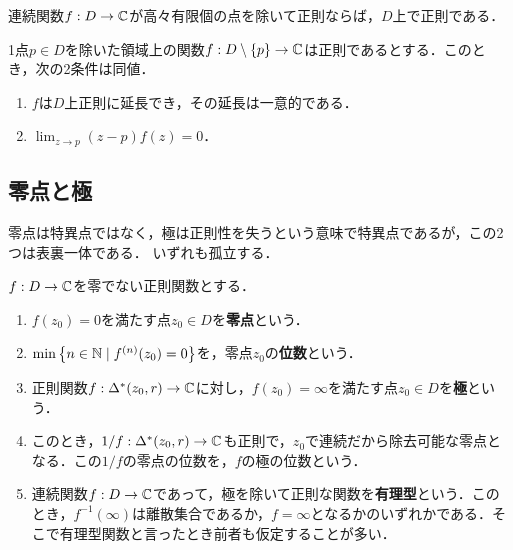 \documentclass[uplatex, dvipdfmx]{jsreport}
\begin{document}
\begin{corollary}[連続性による除去]
    連続関数$f:D\to\mathbb{C}$が高々有限個の点を除いて正則ならば，$D$上で正則である．
\end{corollary}

\begin{corollary}[除去可能特異点の特徴付け]
    1点$p\in D$を除いた領域上の関数$f:D\setminus\{p\}\to\mathbb{C}$は正則であるとする．このとき，次の2条件は同値．
    \begin{enumerate}
        \item $f$は$D$上正則に延長でき，その延長は一意的である．
        \item $\lim_{z\to p}(z-p)f(z)=0$．
    \end{enumerate}
\end{corollary}

\subsection{零点と極}

\begin{tcolorbox}[colframe=ForestGreen, colback=ForestGreen!10!white,breakable,colbacktitle=ForestGreen!40!white,coltitle=black,fonttitle=\bfseries\sffamily,
title=]
    零点は特異点ではなく，極は正則性を失うという意味で特異点であるが，この2つは表裏一体である．
    いずれも孤立する．
\end{tcolorbox}

\begin{definition}
    $f:D\to\mathbb{C}$を零でない正則関数とする．
    \begin{enumerate}
        \item $f(z_0)=0$を満たす点$z_0\in D$を\textbf{零点}という．
        \item $\min\left\{n\in\mathbb{N}\mid f^{(n)}(z_0)=0\right\}$を，零点$z_0$の\textbf{位数}という．
        \item 正則関数$f:\Delta^*(z_0,r)\to\mathbb{C}$に対し，$f(z_0)=\infty$を満たす点$z_0\in D$を\textbf{極}という．
        \item このとき，$1/f:\Delta^*(z_0,r)\to\mathbb{C}$も正則で，$z_0$で連続だから除去可能な零点となる．この$1/f$の零点の位数を，$f$の極の位数という．
        \item 連続関数$f:D\to\mathbb{C}$であって，極を除いて正則な関数を\textbf{有理型}という．このとき，$f^{-1}(\infty)$は離散集合であるか，$f=\infty$となるかのいずれかである．そこで有理型関数と言ったとき前者も仮定することが多い．
    \end{enumerate}
\end{definition}
\end{document}
